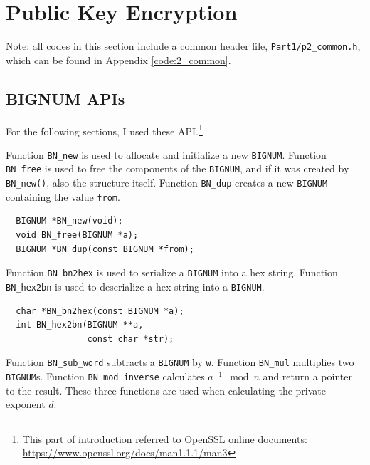 \section{Public Key Encryption}

Note: all codes in this section include a common header file, \texttt{Part1/p2\_common.h}, which can be found in Appendix \ref{code:2_common}.

\setcounter{subsection}{1}

\subsection{BIGNUM APIs}

For the following sections, I used these API.\footnote{This part of introduction referred to OpenSSL online documents: \url{https://www.openssl.org/docs/man1.1.1/man3}}

Function \texttt{BN\_new} is used to allocate and initialize a new \texttt{BIGNUM}.
Function \texttt{BN\_free} is used to free the components of the \texttt{BIGNUM}, and if it was created by \texttt{BN\_new()}, also the structure itself.
Function \texttt{BN\_dup} creates a new \texttt{BIGNUM} containing the value \texttt{from}.
\begin{verbatim}
  BIGNUM *BN_new(void);
  void BN_free(BIGNUM *a);
  BIGNUM *BN_dup(const BIGNUM *from);
\end{verbatim}

Function \texttt{BN\_bn2hex} is used to serialize a \texttt{BIGNUM} into a hex string.
Function \texttt{BN\_hex2bn} is used to deserialize a hex string into a \texttt{BIGNUM}.
\begin{verbatim}
  char *BN_bn2hex(const BIGNUM *a);
  int BN_hex2bn(BIGNUM **a, 
                const char *str);
\end{verbatim}

Function \texttt{BN\_sub\_word} subtracts a \texttt{BIGNUM} by \texttt{w}.
Function \texttt{BN\_mul} multiplies two \texttt{BIGNUM}s.
Function \texttt{BN\_mod\_inverse} calculates $a^{-1} \mod{n}$ and return a pointer to the result.
These three functions are used when calculating the private exponent $d$.

